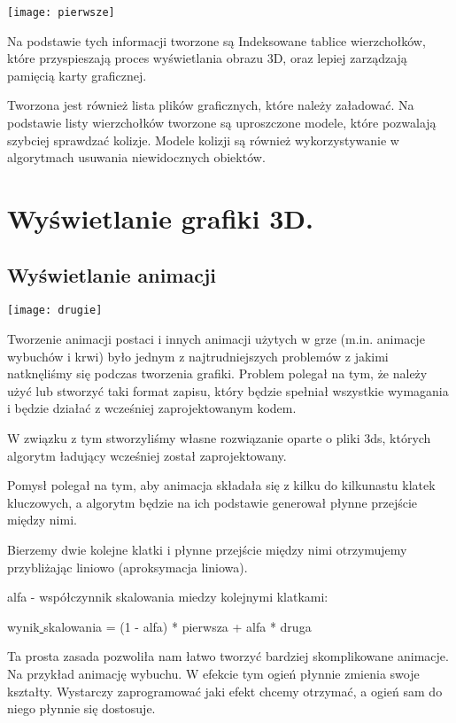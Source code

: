 \documentclass[licencjacka]{pracamgr}
\begin{document}
\begin{center}
\texttt{[image: pierwsze]}
\end{center}

Na podstawie tych informacji tworzone są Indeksowane tablice wierzchołków, które przyspieszają proces wyświetlania obrazu 3D, oraz lepiej zarządzają pamięcią karty graficznej.

Tworzona jest również lista plików graficznych, które należy załadować.
Na podstawie listy wierzchołków tworzone są uproszczone modele, które pozwalają szybciej sprawdzać kolizje. Modele kolizji są również wykorzystywanie w algorytmach usuwania niewidocznych obiektów.

\section{Wyświetlanie grafiki 3D.}

\subsection{Wyświetlanie animacji}

\begin{center}
\texttt{[image: drugie]}
\end{center}

Tworzenie animacji postaci i innych animacji użytych w grze (m.in. animacje wybuchów i krwi) było jednym z najtrudniejszych problemów z jakimi natknęliśmy się podczas tworzenia grafiki. Problem polegał na tym, że należy użyć lub stworzyć taki format zapisu, który będzie spełniał wszystkie wymagania i będzie działać z wcześniej zaprojektowanym kodem.

W związku z tym stworzyliśmy własne rozwiązanie oparte o pliki 3ds, których algorytm ładujący wcześniej został zaprojektowany.

Pomysł polegał na tym, aby animacja składała się z kilku do kilkunastu klatek kluczowych, a algorytm będzie na ich podstawie generował płynne przejście między nimi.

Bierzemy dwie kolejne klatki i płynne przejście między nimi otrzymujemy przybliżając   liniowo (aproksymacja liniowa).

alfa - współczynnik skalowania miedzy kolejnymi klatkami:

wynik\underline{ }skalowania = (1 - alfa) * pierwsza + alfa * druga

Ta prosta zasada pozwoliła nam łatwo tworzyć bardziej skomplikowane animacje. Na przykład animację wybuchu. W efekcie tym ogień płynnie zmienia swoje kształty. Wystarczy zaprogramować jaki efekt chcemy otrzymać, a ogień sam do niego płynnie się dostosuje.
\end{document}

